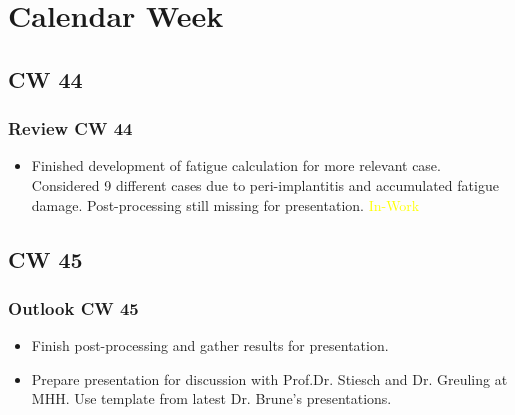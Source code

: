 \section{Calendar Week}
\subsection{CW 44}
\begin{frame}
  \frametitle{Review CW 44}
	\begin{itemize}
		\item Finished development of fatigue calculation for more relevant case. Considered 9 different cases due to peri-implantitis and accumulated fatigue damage.
Post-processing still missing for presentation.
\textcolor{yellow}{In-Work}
	\end{itemize}
\end{frame}


\subsection{CW 45}
\begin{frame}
  \frametitle{Outlook CW 45}
	\begin{itemize}
		\item Finish post-processing and gather results for presentation.
		\item Prepare presentation for discussion with Prof.Dr. Stiesch and Dr. Greuling at MHH. Use template from latest Dr. Brune's presentations.
	\end{itemize}
\end{frame}

